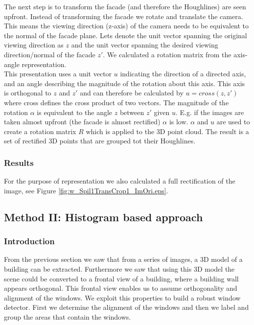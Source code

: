 The next step is to transform the facade (and therefore the Houghlines) are
seen upfront. Instead of transforming the facade we rotate and translate the camera. 
This means the viewing direction (z-axis) of the camera needs
to be equivalent to the normal of the facade plane. Lets denote the
unit vector spanning the original viewing direction as $z$ and the
unit vector spanning the desired viewing direction/normal of the facade $z'$.
We calculated a rotation matrix from the axis-angle representation.\\

This presentation uses a unit vector $u$ indicating the direction of a directed axis, and an
angle describing the magnitude of the rotation about this axis.
This axis is orthogonal to $z$ and $z'$ and can therefore be
calculated by $u = cross(z,z')$ where cross defines the cross product of
two vectors.
The magnitude of the rotation $\alpha$ is equivalent to the angle $z$ between $z'$ given $u$. 
E.g. if the images are taken almost upfront (the facade is almost rectified) $\alpha$ is low.
$\alpha$ and $u$ are used to create a rotation matrix $R$ which is applied to the 3D point cloud.
The result is a set of rectified 3D points that are grouped tot their Houghlines.

\subsubsection{Results}
For the purpose of representation we also calculated a full rectification
of the image, see Figure \ref{fig:w_Spil1TransCrop1_ImOri.eps}.


\subsection{Method II: Histogram based approach} 
\subsubsection{Introduction}
From the previous section we saw that from a series of images, a 3D model of a
building can be extracted. Furthermore we saw that using this 3D model the
scene could be converted to a frontal view of a building, where a building wall
appears orthogonal.  This frontal view enables us to assume orthogonality and
alignment of the windows. 
We exploit this properties to build a robust window detector. First we determine
the alignment of the windows and then we label and group the areas that
contain the windows. 

